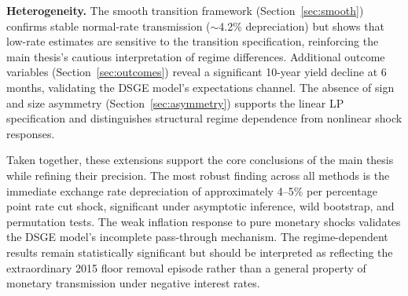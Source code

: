 \documentclass[12pt,a4paper]{article}
\begin{document}
\textbf{Heterogeneity.} The smooth transition framework (Section~\ref{sec:smooth}) confirms stable normal-rate transmission ($\sim$4.2\% depreciation) but shows that low-rate estimates are sensitive to the transition specification, reinforcing the main thesis's cautious interpretation of regime differences. Additional outcome variables (Section~\ref{sec:outcomes}) reveal a significant 10-year yield decline at 6 months, validating the DSGE model's expectations channel. The absence of sign and size asymmetry (Section~\ref{sec:asymmetry}) supports the linear LP specification and distinguishes structural regime dependence from nonlinear shock responses.

Taken together, these extensions support the core conclusions of the main thesis while refining their precision. The most robust finding across all methods is the immediate exchange rate depreciation of approximately 4--5\% per percentage point rate cut shock, significant under asymptotic inference, wild bootstrap, and permutation tests. The weak inflation response to pure monetary shocks validates the DSGE model's incomplete pass-through mechanism. The regime-dependent results remain statistically significant but should be interpreted as reflecting the extraordinary 2015 floor removal episode rather than a general property of monetary transmission under negative interest rates.


\newpage

\end{document}

